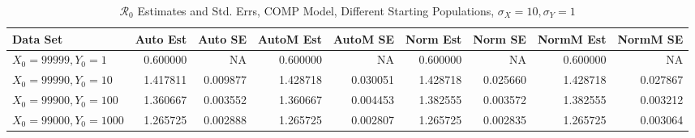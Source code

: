 \documentclass[12pt]{article}
\newcommand{\rr}{\ensuremath{\mathcal{R}_0}}
\begin{document}
\begin{table}[H]
	
	\caption{$\rr$ Estimates and Std. Errs, COMP Model,
		Different Starting Populations, 
		$\sigma_X = 10, \sigma_Y = 1$}
	\begin{footnotesize}
		\hskip -1.7cm
		\begin{tabular}{l|r|r|r|r|r|r|r|r}
			\hline
			Data Set & Auto Est & Auto SE & AutoM Est & AutoM SE & Norm Est & Norm SE & NormM Est & NormM SE\\
			\hline
			$X_0 = 99999, Y_0 = 1$ & 0.600000 & NA & 0.600000 & NA & 0.600000 & NA & 0.600000 & NA\\
			\hline
			$X_0 = 99990, Y_0 = 10$ & 1.417811 & 0.009877 & 1.428718 & 0.030051 & 1.428718 & 0.025660 & 1.428718 & 0.027867\\
			\hline
			$X_0 = 99900, Y_0 = 100$ & 1.360667 & 0.003552 & 1.360667 & 0.004453 & 1.382555 & 0.003572 & 1.382555 & 0.003212\\
			\hline
			$X_0 = 99000, Y_0 = 1000$ & 1.265725 & 0.002888 & 1.265725 & 0.002807 & 1.265725 & 0.002835 & 1.265725 & 0.003064\\
			\hline
		\end{tabular}
	\end{footnotesize}
\end{table}
\end{document}

